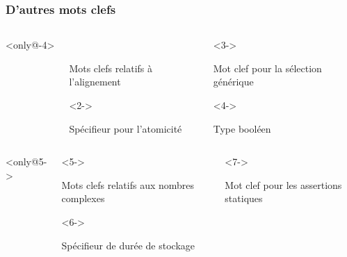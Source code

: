 \documentclass{cppcourses}
\begin{document}
\begin{frame}

\frametitle{D'autres mots clefs}

\begin{columns}<only@-4>

\begin{column}{0.5 \textwidth}

\begin{myfigure}
 \\
\caption{Mots clefs relatifs à l'alignement}
\end{myfigure}

\begin{myfigure}<2->
\caption{Spécifieur pour l'atomicité}
\end{myfigure}

\end{column}

\begin{column}{0.5 \textwidth}

\begin{myfigure}<3->
\caption{Mot clef pour la sélection générique}
\end{myfigure}

\begin{myfigure}<4->
\caption{Type booléen}
\end{myfigure}

\end{column}

\end{columns}

\begin{columns}<only@5->

\begin{column}{0.5 \textwidth}

\begin{myfigure}<5->
 \\
\caption{Mots clefs relatifs aux nombres complexes}
\end{myfigure}

\begin{myfigure}<6->
\caption{Spécifieur de durée de stockage}
\end{myfigure}

\end{column}

\begin{column}{0.5 \textwidth}

\begin{myfigure}<7->
\caption{Mot clef pour les assertions statiques}
\end{myfigure}

\end{column}

\end{columns}

\end{frame}
\end{document}
